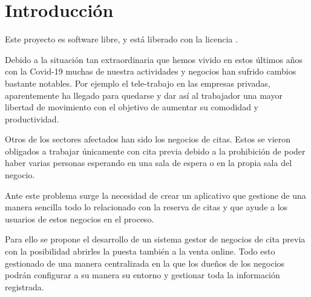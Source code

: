 \chapter{Introducción}

Este proyecto es software libre, y está liberado con la licencia \cite{gplv3}.

Debido a la situación tan extraordinaria que hemos vivido en estos últimos años con la Covid-19
muchas de nuestra actividades y negocios han sufrido cambios bastante notables.
Por ejemplo el tele-trabajo en las empresas privadas, aparentemente ha llegado para
quedarse y dar así al trabajador una mayor libertad de movimiento con el objetivo de
aumentar su comodidad y productividad.

Otros de los sectores afectados han sido los negocios de citas. Estos se vieron obligados
a trabajar únicamente con cita previa debido a la prohibición de poder haber varias personas
esperando en una sala de espera o en la propia sala del negocio.

Ante este problema surge la necesidad de crear un aplicativo que gestione de una manera
sencilla todo lo relacionado con la reserva de citas y que ayude a los usuarios de estos negocios en el proceso.

Para ello se propone el desarrollo de un sistema gestor de negocios de cita previa con la posibilidad abrirles la puesta también a la venta online. Todo esto gestionado de una manera centralizada en la que los dueños de los negocios podrán configurar a su manera su entorno y gestionar toda la información registrada. 
